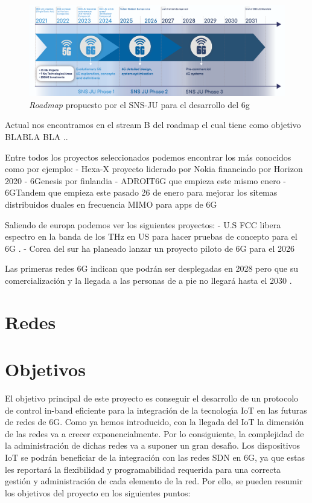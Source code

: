 \begin{figure}[ht]
    \centering
    \includegraphics[width=\textwidth]{archivos/img/intro/banner-screen-1.png}
    \caption{\textit{Roadmap} propuesto por el SNS-JU para el desarrollo del \gls{6g} \cite{eu6gSNS}}
    \label{fig:intro_banner_screen}
\end{figure}


Actual nos encontramos en el stream B del roadmap \cite{eu6GFase2} el cual tiene como objetivo BLABLA BLA ..

Entre todos los proyectos seleccionados podemos encontrar los más conocidos como por ejemplo:
-   Hexa-X proyecto liderado por Nokia financiado por Horizon 2020 \cite{Uusitalo2021}
-   6Genesis por finlandia \cite{Katz2019}
-   ADROIT6G que empieza este mismo enero \cite{ADROIT6G}
-   6GTandem que empieza este pasado 26 de enero para mejorar los sitemas distribuidos duales en frecuencia MIMO para apps de 6G \cite{6GTandem}

Saliendo de europa podemos ver los siguientes proyectos:
-   U.S FCC libera espectro en la banda de los THz en US para hacer pruebas de concepto para el 6G \cite{us6g}.
-   Corea del sur ha planeado lanzar un proyecto piloto de 6G para el 2026 \cite{coreaSur6G}


Las primeras redes 6G indican que podrán ser desplegadas en 2028 pero que su comercialización y la llegada a las personas de a pie no llegará hasta el 2030 \cite{Nguyen2022}.



\section{Redes }
\label{sec:6gIoT_sdn}


\section{Objetivos}
\label{sec:obj}

El objetivo principal de este proyecto es conseguir el desarrollo de un protocolo de control in-band eficiente
para la integración de la tecnologı́a IoT en las futuras de redes de 6G. Como ya hemos introducido, con la
llegada del IoT la dimensión de las redes va a crecer exponencialmente. Por lo consiguiente, la complejidad
de la administración de dichas redes va a suponer un gran desafı́o. Los dispositivos IoT se podrán beneficiar
de la integración con las redes SDN en 6G, ya que estas les reportará la flexibilidad y programabilidad
requerida para una correcta gestión y administración de cada elemento de la red. Por ello, se pueden resumir
los objetivos del proyecto en los siguientes puntos:

